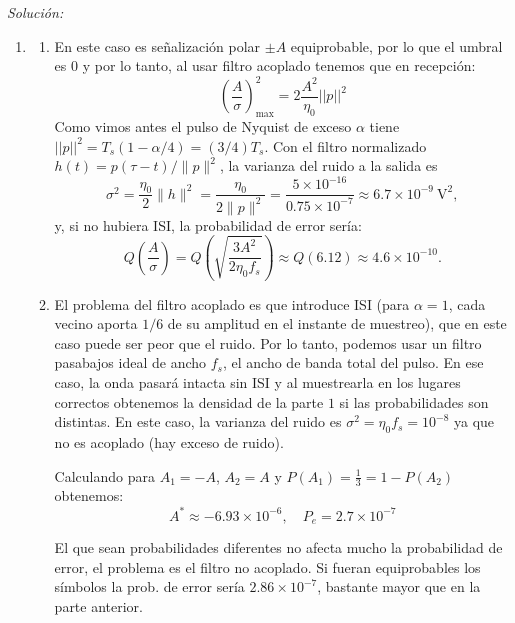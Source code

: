 \documentclass[a4paper,11pt]{article}
\newenvironment{solucion}[1][]{
\noindent \large \textsl{Solución:} \ifthenelse{\equal{#1}{}}{}{\emph{(#1)}}

\smallskip
}{
\bigskip
}
\begin{document}
\begin{solucion}
\begin{enumerate}
        La probabilidad de error es:
        \begin{equation*}
                P_e = P(A_1)Q\left(\frac{A^*-A_1}{\sigma}\right)+ P(A_2)Q\left(\frac{A_2-A^*}{\sigma}\right)
        \end{equation*}

\item   \begin{enumerate}
        \item En este caso es señalización polar $\pm A$ equiprobable, por lo que el umbral es $0$ y por lo tanto, al usar filtro acoplado tenemos que en recepción:
        \begin{equation*}
                \left(\frac{A}{\sigma}\right)^2_{\max} = 2 \frac{A^2}{\eta_0} ||p||^2
        \end{equation*}
        Como vimos antes el pulso de Nyquist de exceso $\alpha$ tiene $||p||^2 = T_s(1-\alpha/4) = (3/4)T_s$. Con el filtro normalizado $h(t)=p(\tau-t)/\|p\|^2$, la varianza del ruido a la salida es
        \begin{equation*}
                \sigma^2=\frac{\eta_0}{2}\|h\|^2=\frac{\eta_0}{2\|p\|^2}=\frac{5\times10^{-16}}{0.75\times10^{-7}}\approx 6.7\times10^{-9}\ \unit{\square\volt},
        \end{equation*}
        y, si no hubiera ISI, la probabilidad de error sería:
        \begin{equation*}
                Q\left(\frac{A}{\sigma}\right) = Q\left(\sqrt{\frac{3A^2}{2\eta_0 f_s}}\right) \approx Q(6.12) \approx 4.6 \times 10^{-10}.
        \end{equation*}

        \item El problema del filtro acoplado es que introduce ISI (para $\alpha=1$, cada vecino aporta $1/6$ de su amplitud en el instante de muestreo), que en este caso puede ser peor que el ruido. Por lo tanto, podemos usar un filtro pasabajos ideal de ancho $f_s$, el ancho de banda total del pulso. En ese caso, la onda pasará intacta sin ISI y al muestrearla en los lugares correctos obtenemos la densidad de la parte $1$ si las probabilidades son distintas. En este caso, la varianza del ruido es $\sigma^2 = \eta_0 f_s = 10^{-8}$ ya que no es acoplado (hay exceso de ruido).
        
        Calculando para $A_1=-A$, $A_2=A$ y $P(A_1)=\frac{1}{3}=1-P(A_2)$ obtenemos:
        \begin{equation*}
                A^* \approx - 6.93\times 10^{-6}, \quad P_e = 2.7\times 10^{-7}
        \end{equation*}

        El que sean probabilidades diferentes no afecta mucho la probabilidad de error, el problema es el filtro no acoplado. Si fueran equiprobables los símbolos la prob. de error sería $2.86\times 10^{-7}$, bastante mayor que en la parte anterior.
        \end{enumerate}
\end{enumerate}
\end{solucion}
\end{document}
